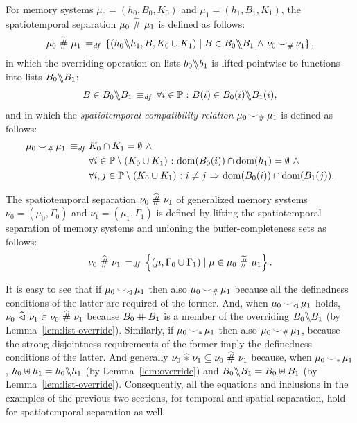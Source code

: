 \documentclass[11pt]{report}
\begin{document}
For memory systems $\mu_0 = (h_0,B_0,K_0)$ and $\mu_1 = (h_1,B_1,K_1)$, the spatiotemporal separation $\mu_0 \operatorname{\,\widetilde{\#}\,} \mu_1$ is defined as follows: \[ \mu_0 \operatorname{\,\widetilde{\#}\,} \mu_1 \operatorname{\;=_{\mathit{df}}\;} \left\lbrace (h_0 \backslash\!\!\backslash h_1, B, K_0 \cup K_1) \mid B \in B_0 \backslash\!\!\backslash B_1 \operatorname{\,\wedge\,} \nu_0 \operatorname{\smile}_\# \nu_1 \right\rbrace,\] in which the overriding operation on lists $b_0 \backslash\!\!\backslash b_1$ is lifted pointwise to functions into lists $B_0 \backslash\!\!\backslash B_1$: \[ B \in B_0 \backslash\!\!\backslash B_1 \operatorname{\;\equiv_{\mathit{df}}\;} \forall i \in \mathbb{P} \operatorname{\,:\,} B(i) \in B_0(i) \backslash\!\!\backslash B_1(i),\] and in which the \emph{spatiotemporal compatibility relation} $\mu_0 \operatorname{\smile}_\# \mu_1$ is defined as follows: 
\begin{align*}
\mu_0 \operatorname{\smile}_\# \mu_1 \operatorname{\;\equiv_{\mathit{df}}\;} & K_0 \cap K_1 = \operatorname{\emptyset} \operatorname{\,\wedge\,} \\ 
  & \forall i \in \mathbb{P} \setminus (K_0 \cup K_1) \operatorname{\,:\,} \operatorname{\mathrm{dom}}(B_0(i)) \cap \operatorname{\mathrm{dom}}(h_1) = \operatorname{\emptyset} \operatorname{\,\wedge\,} \\  
  & \forall i,j \in \mathbb{P} \setminus (K_0 \cup K_1) \operatorname{\,:\,} i \neq j \operatorname{\,\Rightarrow\,} \operatorname{\mathrm{dom}}(B_0(i)) \cap \operatorname{\mathrm{dom}}(B_1(j)). 
\end{align*}

The spatiotemporal separation $\nu_0 \operatorname{\,\widehat{\#}\,} \nu_1$ of generalized memory systems $\nu_0 = (\mu_0,\Gamma_0)$ and $\nu_1 = (\mu_1,\Gamma_1)$ is defined by lifting the spatiotemporal separation of memory systems and unioning the buffer-completeness sets as follows: \[ \nu_0 \operatorname{\,\widehat{\#}\,} \nu_1 \operatorname{\;=_{\mathit{df}}\;} \left\lbrace (\mu,\Gamma_0 \cup \Gamma_1) \mid \mu \in \mu_0 \operatorname{\,\widetilde{\#}\,} \mu_1 \right\rbrace.\]

It is easy to see that if $\mu_0 \operatorname{\smile}_\vartriangleleft \mu_1$ then also $\mu_0 \operatorname{\smile}_\# \mu_1$ because all the definedness conditions of the latter are required of the former. And, when $\mu_0 \operatorname{\smile}_\vartriangleleft \mu_1$ holds, $\nu_0 \operatorname{\,\widehat{\vartriangleleft}\,} \nu_1 \in \nu_0 \operatorname{\,\widehat{\#}\,} \nu_1$ because $B_0 \operatorname{+\!\!\!+} B_1$ is a member of the overriding $B_0 \backslash\!\!\backslash B_1$ (by Lemma~\ref{lem:list-override}). Similarly, if $\mu_0 \operatorname{\smile}_\ast \mu_1$ then also $\mu_0 \operatorname{\smile}_\# \mu_1$, because the strong disjointness requirements of the former imply the definedness conditions of the latter. And generally $\nu_0 \operatorname{\,\widehat{\ast}\,} \nu_1 \subseteq \nu_0 \operatorname{\,\widehat{\#}\,} \nu_1$ because, when $\mu_0 \operatorname{\smile}_\ast \mu_1$, $h_0 \uplus h_1 = h_0 \backslash\!\!\backslash h_1$ (by Lemma~\ref{lem:override}) and $B_0 \backslash\!\!\backslash B_1 = B_0 \uplus B_1$ (by Lemma~\ref{lem:list-override}). Consequently, all the equations and inclusions in the examples of the previous two sections, for temporal and spatial separation, hold for spatiotemporal separation as well. 
\end{document}
